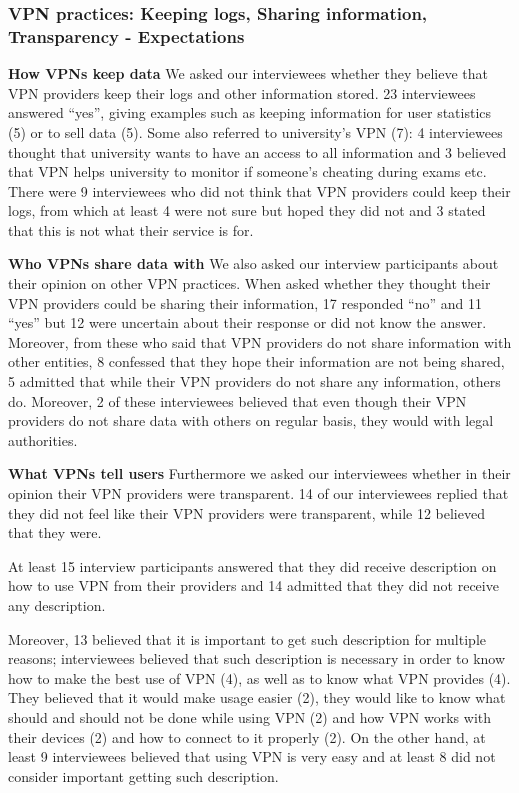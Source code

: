\subsubsection{VPN practices: Keeping logs, Sharing information, Transparency - Expectations} 
\textbf{How VPNs keep data}
We asked our interviewees whether they believe that VPN providers keep their logs and other information stored. 23 interviewees answered “yes”, giving examples such as keeping information for user statistics (5) or to sell data (5). Some also referred to university’s VPN (7): 4 interviewees thought that university wants to have an access to all information and 3 believed that VPN helps university to monitor if someone’s cheating during exams etc. There were 9 interviewees who did not think that VPN providers could keep their logs, from which at least 4 were not sure but hoped they did not and 3 stated that this is not what their service is for.

\textbf{Who VPNs share data with}
We also asked our interview participants about their opinion on other VPN practices. When asked whether they thought their VPN providers could be sharing their information, 17 responded “no” and 11 “yes” but 12 were uncertain about their response or did not know the answer.  Moreover, from these who said that VPN providers do not share information with other entities, 8 confessed that they hope their information are not being shared, 5 admitted that while their VPN providers do not share any information, others do. Moreover, 2 of these interviewees believed that even though their VPN providers do not share data with others on regular basis, they would with legal authorities. 

\textbf{What VPNs tell users}
Furthermore we asked our interviewees whether in their opinion their VPN providers were transparent. 14 of our interviewees replied that they did not feel like their VPN providers were transparent, while 12 believed that they were. 

At least 15 interview participants answered that they did receive description on how to use VPN from their providers and 14 admitted that they did not receive any description.  

Moreover, 13 believed that it is important to get such description for multiple reasons; interviewees believed that such description is necessary in order to know how to make the best use of VPN (4), as well as to know what VPN provides (4). They believed that it would make usage easier (2), they would like to know what should and should not be done while using VPN (2) and how VPN works with their devices (2) and how to connect to it properly (2). On the other hand, at least 9 interviewees believed that using VPN is very easy and at least 8 did not consider important getting such description. 


